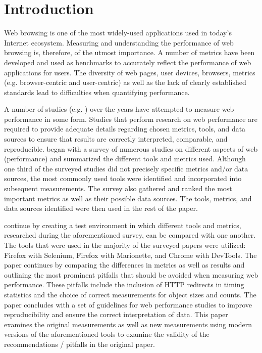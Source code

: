 \section{Introduction}
Web browsing is one of the most widely-used applications used in today's Internet ecosystem. Measuring and understanding the performance of web browsing is, therefore, of the utmost importance. A number of metrics have been developed and used as benchmarks to accurately reflect the performance of web applications for users. The diversity of web pages, user devices, browsers, metrics (e.g. browser-centric and user-centric) as well as the lack of clearly established standards lead to difficulties when quantifying performance.

A number of studies (e.g. \citet{10.1007/978-3-319-30505-9_17}) over the years have attempted to measure web performance in some form. Studies that perform research on web performance are required to provide adequate details regarding chosen metrics, tools, and data sources to ensure that results are correctly interpreted, comparable, and reproducible. \citeauthor{10.1007/978-3-030-15986-3_19} began with a survey of numerous studies on different aspects of web (performance) and summarized the different tools and metrics used. Although one third of the surveyed studies did not precisely specific metrics and/or data sources, the most commonly used tools were identified and incorporated into subsequent measurements. The survey also gathered and ranked the most important metrics as well as their possible data sources. The tools, metrics, and data sources identified were then used in the rest of the paper.

\citeauthor{10.1007/978-3-030-15986-3_19} continue by creating a test environment in which different tools and metrics, researched during the aforementioned survey, can be compared with one another. The tools that were used in the majority of the surveyed papers were utilized: Firefox with Selenium, Firefox with Marionette, and Chrome with DevTools. The paper continues by comparing the differences in metrics as well as results and outlining the most prominent pitfalls that should be avoided when measuring web performance. These pitfalls include the inclusion of HTTP redirects in timing statistics and the choice of correct measurements for object sizes and counts. The paper concludes with a set of guidelines for web performance studies to improve reproducibility and ensure the correct interpretation of data. This paper examines the original measurements as well as new measurements using modern versions of the aforementioned tools to examine the validity of the recommendations / pitfalls in the original paper.